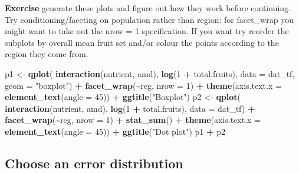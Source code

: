 \documentclass[
  12pt,
]{book}
\makeatletter
\newenvironment{Shaded}{\begin{snugshade}}{\end{snugshade}}
\newcommand{\DataTypeTok}[1]{\textcolor[rgb]{0.13,0.29,0.53}{#1}}
\newcommand{\DecValTok}[1]{\textcolor[rgb]{0.00,0.00,0.81}{#1}}
\newcommand{\KeywordTok}[1]{\textcolor[rgb]{0.13,0.29,0.53}{\textbf{#1}}}
\newcommand{\NormalTok}[1]{#1}
\newcommand{\OperatorTok}[1]{\textcolor[rgb]{0.81,0.36,0.00}{\textbf{#1}}}
\newcommand{\StringTok}[1]{\textcolor[rgb]{0.31,0.60,0.02}{#1}}
\newenvironment{kframe}{%
\medskip{}
\setlength{\fboxsep}{.8em}
\def\at@end@of@kframe{}%
\ifinner\ifhmode%
 \def\at@end@of@kframe{\end{minipage}}%
 \begin{minipage}{\columnwidth}%
\fi\fi%
\def\FrameCommand##1{\hskip\@totalleftmargin \hskip-\fboxsep
\colorbox{incolor}{##1}\hskip-\fboxsep
    \hskip-\linewidth \hskip-\@totalleftmargin \hskip\columnwidth}%
\MakeFramed {\advance\hsize-\width
  \@totalleftmargin\z@ \linewidth\hsize
  \@setminipage}}%
{\par\unskip\endMakeFramed%
\at@end@of@kframe}
\newenvironment{rmdblock}[1]
 {
 \begin{itemize}
 \renewcommand{\labelitemi}{
   \raisebox{-.7\height}[0pt][0pt]{
     {\setkeys{Gin}{width=3em,keepaspectratio}\texttt{[image: images/icons/\#1]}}
   }
 }
 \begin{kframe}
 \setlength{\fboxsep}{1em}
 \item
 }
 {
 \end{kframe}
 \end{itemize}
 }
\newenvironment{rmdcode}
  {\begin{rmdblock}{code}}
  {\end{rmdblock}}
\makeatother
\begin{document}
\begin{rmdcode}
\textbf{Exercise} generate these plots and figure out how they work before continuing. Try conditioning/faceting on population rather than region: for facet\_wrap you might want to take out the nrow = 1 specification. If you want try reorder the subplots by overall mean fruit set and/or colour the points according to the region they come from.
\end{rmdcode}

\begin{Shaded}
\begin{Highlighting}[]
\NormalTok{p1 \textless{}{-}}\StringTok{ }\KeywordTok{qplot}\NormalTok{(}
    \KeywordTok{interaction}\NormalTok{(nutrient, amd),}
    \KeywordTok{log}\NormalTok{(}\DecValTok{1} \OperatorTok{+}\StringTok{ }\NormalTok{total.fruits),}
    \DataTypeTok{data =}\NormalTok{ dat\_tf, }\DataTypeTok{geom =} \StringTok{"boxplot"}\NormalTok{) }\OperatorTok{+}
\StringTok{  }\KeywordTok{facet\_wrap}\NormalTok{(}\OperatorTok{\textasciitilde{}}\NormalTok{reg, }\DataTypeTok{nrow =} \DecValTok{1}\NormalTok{) }\OperatorTok{+}
\StringTok{  }\KeywordTok{theme}\NormalTok{(}\DataTypeTok{axis.text.x =} \KeywordTok{element\_text}\NormalTok{(}\DataTypeTok{angle =} \DecValTok{45}\NormalTok{)) }\OperatorTok{+}
\StringTok{  }\KeywordTok{ggtitle}\NormalTok{(}\StringTok{"Boxplot"}\NormalTok{)}
\NormalTok{p2 \textless{}{-}}\StringTok{ }\KeywordTok{qplot}\NormalTok{(}
    \KeywordTok{interaction}\NormalTok{(nutrient, amd),}
    \KeywordTok{log}\NormalTok{(}\DecValTok{1} \OperatorTok{+}\StringTok{ }\NormalTok{total.fruits),}
    \DataTypeTok{data =}\NormalTok{ dat\_tf) }\OperatorTok{+}
\StringTok{  }\KeywordTok{facet\_wrap}\NormalTok{(}\OperatorTok{\textasciitilde{}}\NormalTok{reg, }\DataTypeTok{nrow =} \DecValTok{1}\NormalTok{) }\OperatorTok{+}
\StringTok{  }\KeywordTok{stat\_sum}\NormalTok{() }\OperatorTok{+}
\StringTok{  }\KeywordTok{theme}\NormalTok{(}\DataTypeTok{axis.text.x =} \KeywordTok{element\_text}\NormalTok{(}\DataTypeTok{angle =} \DecValTok{45}\NormalTok{)) }\OperatorTok{+}
\StringTok{  }\KeywordTok{ggtitle}\NormalTok{(}\StringTok{"Dot plot"}\NormalTok{)}
\NormalTok{p1 }\OperatorTok{+}\StringTok{ }\NormalTok{p2}
\end{Highlighting}
\end{Shaded}

\hypertarget{choose-an-error-distribution}{%
\subsection{Choose an error distribution}\label{choose-an-error-distribution}}
\end{document}

